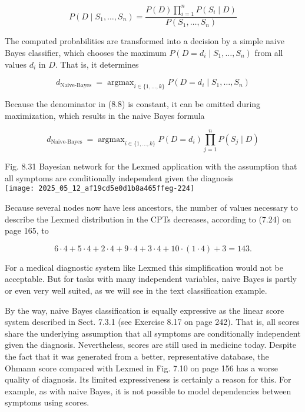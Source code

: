 \documentclass[10pt]{article}
\begin{document}
\begin{equation*}
P\left(D \mid S_{1}, \ldots, S_{n}\right)=\frac{P(D) \prod_{i=1}^{n} P\left(S_{i} \mid D\right)}{P\left(S_{1}, \ldots, S_{n}\right)} \tag{8.8}
\end{equation*}


The computed probabilities are transformed into a decision by a simple naive Bayes classifier, which chooses the maximum $P\left(D=d_{i} \mid S_{1}, \ldots, S_{n}\right)$ from all values $d_{i}$ in $D$. That is, it determines

$$
d_{\text {Naive-Bayes }}=\operatorname{argmax}_{i \in\{1, \ldots, k\}} P\left(D=d_{i} \mid S_{1}, \ldots, S_{n}\right)
$$

Because the denominator in (8.8) is constant, it can be omitted during maximization, which results in the naive Bayes formula

$$
d_{\text {Naive-Bayes }}=\operatorname{argmax}_{i \in\{1, \ldots, k\}} P\left(D=d_{i}\right) \prod_{j=1}^{n} P\left(S_{j} \mid D\right)
$$

Fig. 8.31 Bayesian network for the Lexmed application with the assumption that all symptoms are conditionally independent given the diagnosis\\
\texttt{[image: 2025\_05\_12\_af19cd5e0d1b8a465ffeg-224]}

Because several nodes now have less ancestors, the number of values necessary to describe the Lexmed distribution in the CPTs decreases, according to (7.24) on page 165, to

$$
6 \cdot 4+5 \cdot 4+2 \cdot 4+9 \cdot 4+3 \cdot 4+10 \cdot(1 \cdot 4)+3=143 .
$$

For a medical diagnostic system like Lexmed this simplification would not be acceptable. But for tasks with many independent variables, naive Bayes is partly or even very well suited, as we will see in the text classification example.

By the way, naive Bayes classification is equally expressive as the linear score system described in Sect. 7.3.1 (see Exercise 8.17 on page 242). That is, all scores share the underlying assumption that all symptoms are conditionally independent given the diagnosis. Nevertheless, scores are still used in medicine today. Despite the fact that it was generated from a better, representative database, the Ohmann score compared with Lexmed in Fig. 7.10 on page 156 has a worse quality of diagnosis. Its limited expressiveness is certainly a reason for this. For example, as with naive Bayes, it is not possible to model dependencies between symptoms using scores.
\end{document}
